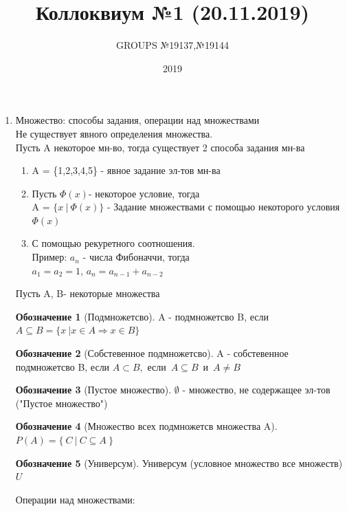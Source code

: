 \documentclass[a4paper]{article}
\title{ Коллоквиум №1 (20.11.2019) }
\author{GROUPS №19137,№19144}
\date{2019\\}
\theoremstyle{definition}
\newtheorem*{name}{Обозначение}
\begin{document}
\maketitle
\begin{enumerate}
 \item Множество: способы задания, операции над множествами
       \\ Не существует явного определения множества.
       \\ Пусть A некоторое мн-во, тогда существует 2 способа задания мн-ва
       \begin{enumerate}
        \item A = \{1,2,3,4,5\} - явное задание эл-тов мн-ва \\
        \item Пусть $\Phi(x)$- некоторое условие, тогда \\A = $\{x \ | \ \Phi(x) \}$ - Задание множествами с помощью некоторого условия $\Phi(x)$
        \item С помощью рекуретного соотношения.\\
              Пример: $a_n$ - числа Фибоначчи, тогда \\
              $a_1=a_2=1$, $a_n = a_{n-1}+a_{n-2}$
       \end{enumerate}
       Пусть A, B- некоторые множества \\
       \begin{name}[Подмножетсво]
        A - подмножетсво B, если\\
        \mbox{$A \subseteq B = \{x \ | x\in{A} \Rightarrow x\in{B} \}$}
       \end{name}
       \begin{name}[Собстевенное подмножетсво]
        A - собстевенное подмножетсво B, если
        \mbox{$A \subset B$, если $A \subseteq B$ и $A\ne{B} $}
       \end{name}
       \begin{name}[Пустое множество]
        $\emptyset$ - множество, не содержащее эл-тов ("Пустое множество")
       \end{name}
       \begin{name}[Множество всех подмножетсв множества A]
        \mbox{}\\
        \mbox{$P(A) = \{ \ C\ |\ C \subseteq{A} \ \} $}
       \end{name}
       \begin{name}[Универсум]
        Универсум (условное множество все множеств) $U$
       \end{name}
       Операции над множествами:

\end{enumerate}
\end{document}
